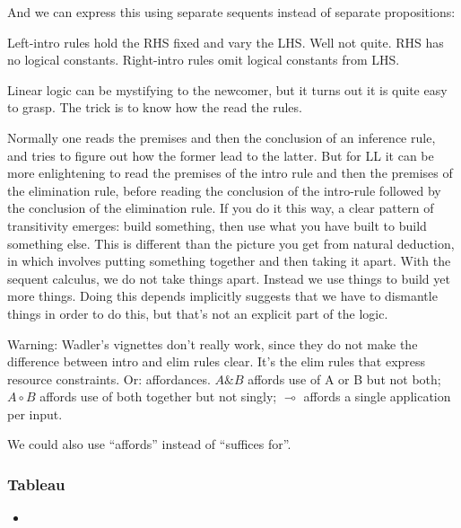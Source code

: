 \documentclass{article}
\begin{document}
And we can express this using separate sequents instead of separate
propositions:


Left-intro rules hold the RHS fixed and vary the LHS. Well not quite. RHS has no logical constants.  Right-intro rules omit logical constants from LHS.

Linear logic can be mystifying to the newcomer, but it turns out it is
quite easy to grasp. The trick is to know how the read the rules.

Normally one reads the premises and then the conclusion of an
inference rule, and tries to figure out how the former lead to the
latter. But for LL it can be more enlightening to read the premises of
the intro rule and then the premises of the elimination rule, before
reading the conclusion of the intro-rule followed by the conclusion of
the elimination rule. If you do it this way, a clear pattern of
transitivity emerges: build something, then use what you have built to
build something else. This is different than the picture you get from
natural deduction, in which involves putting something together and
then taking it apart. With the sequent calculus, we do not take things
apart. Instead we use things to build yet more things. Doing this
depends implicitly suggests that we have to dismantle things in order
to do this, but that's not an explicit part of the logic.

Warning: Wadler's vignettes don't really work, since they do not make
the difference between intro and elim rules clear. It's the elim rules
that express resource constraints. Or: affordances. \(A\&B\) affords
use of A or B but not both; \(A\circ B\) affords use of both together
but not singly; \(\multimap\) affords a single application per input.

We could also use ``affords'' instead of ``suffices for''.

\subsubsection{Tableau}

\begin{itemize}

\item {} \cite{Smullyan1968-SMUFL}

\end{itemize}
\end{document}
